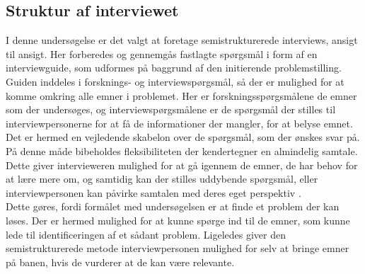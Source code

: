 \subsection {Struktur af interviewet}
I denne undersøgelse er det valgt at foretage semistrukturerede interviews, ansigt til ansigt. Her forberedes og gennemgås fastlagte spørgsmål i form af en interviewguide, som udformes på baggrund af den initierende problemstilling. Guiden inddeles i forsknings- og interviewspørgsmål, så der er mulighed for at komme omkring alle emner i problemet. Her er forskningsspørgsmålene de emner som der undersøges, og interviewspørgsmålene er de spørgsmål der stilles til interviewpersonerne for at få de informationer der mangler, for at belyse emnet. Det er hermed en vejledende skabelon over de spørgsmål, som der ønskes svar på. På denne måde bibeholdes fleksibiliteten der kendertegner en almindelig samtale. Dette giver intervieweren mulighed for at gå igennem de emner, de har behov for at lære mere om, og samtidig kan der stilles uddybende spørgsmål, eller interviewpersonen kan påvirke samtalen med deres eget perspektiv \citep{brinkmann2014}.\\
Dette gøres, fordi formålet med undersøgelsen er at finde et problem der kan løses. Der er hermed mulighed for at kunne spørge ind til de emner, som kunne lede til identificeringen af et sådant problem. Ligeledes giver den semistrukturerede metode interviewpersonen mulighed for selv at bringe emner på banen, hvis de vurderer at de kan være relevante.

